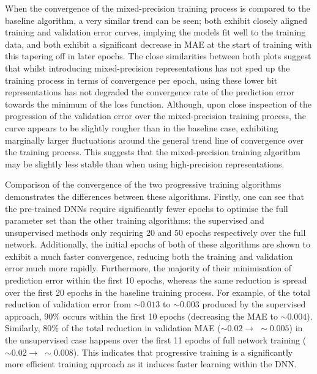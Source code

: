\documentclass[a4paper, 11pt]{report}
\begin{document}
    When the convergence of the mixed-precision training process is compared to the baseline algorithm, a very similar trend can be seen; both exhibit closely aligned training and validation error curves, implying the models fit well to the training data, and both exhibit a significant decrease in MAE at the start of training with this tapering off in later epochs. The close similarities between both plots suggest that whilst introducing mixed-precision representations has not sped up the training process in terms of convergence per epoch, using these lower bit representations has not degraded the convergence rate of the prediction error towards the minimum of the loss function. Although, upon close inspection of the progression of the validation error over the mixed-precision training process, the curve appears to be slightly rougher than in the baseline case, exhibiting marginally larger fluctuations around the general trend line of convergence over the training process. This suggests that the mixed-precision training algorithm may be slightly less stable than when using high-precision representations.

    Comparison of the convergence of the two progressive training algorithms demonstrates the differences between these algorithms. Firstly, one can see that the pre-trained DNNs require significantly fewer epochs to optimise the full parameter set than the other training algorithms: the supervised and unsupervised methods only requiring $20$ and $50$ epochs respectively over the full network. Additionally, the initial epochs of both of these algorithms are shown to exhibit a much faster convergence, reducing both the training and validation error much more rapidly. Furthermore, the majority of their minimisation of prediction error within the first 10 epochs, whereas the same reduction is spread over the first 20 epochs in the baseline training process. For example, of the total reduction of validation error from $\sim \! 0.013$ to $\sim \! 0.003$ produced by the supervised approach, $90\%$ occurs within the first 10 epochs (decreasing the MAE to $\sim \! 0.004$). Similarly, $80\%$ of the total reduction in validation MAE ($\sim \! 0.02 \to \; \sim \! 0.005$) in the unsupervised case happens over the first 11 epochs of full network training ($\sim \! 0.02 \to \; \sim \! 0.008$). This indicates that progressive training is a significantly more efficient training approach as it induces faster learning within the DNN.
\end{document}
